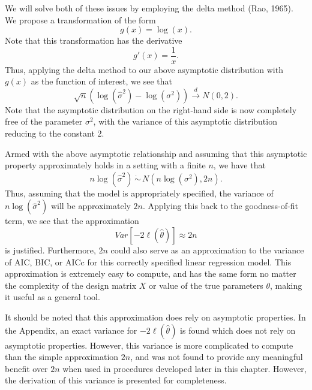 		We will solve both of these issues by employing the delta method (Rao, 1965). We propose a transformation of the form
		\begin{equation}
			g(x) = \log(x) .
		\end{equation}
		Note that this transformation has the derivative
		\begin{equation}
			g'(x) = \frac{1}{x} .
		\end{equation}
		Thus, applying the delta method to our above asymptotic distribution with $g(x)$ as the function of interest, we see that
		\begin{equation}
			\sqrt{n} ( \log (\hat{\sigma}^2) - \log(\sigma^2)) \xrightarrow[]{d} N(0, 2) .
		\end{equation}
		Note that the asymptotic distribution on the right-hand side is now completely free of the parameter $\sigma^2$, with the variance of this asymptotic distribution reducing
		to the constant 2.

		Armed with the above asymptotic relationship and assuming that this asymptotic property approximately holds in a setting with a finite $n$, we have that
		\begin{equation}
			n\log(\hat{\sigma}^2) \, \dot\sim \, N \left( n\log(\sigma^2), 2n \right) .
		\end{equation}
		Thus, assuming that the model is appropriately specified, the variance of $n\log(\hat{\sigma}^2)$ will be approximately $2n$. Applying this back to the goodness-of-fit term,
		we see that the approximation
		\begin{equation}
			Var \left[ -2 \ell (\hat{\theta}  ) \right] \approx 2n
		\end{equation}
		is justified. Furthermore, $2n$ could also serve as an approximation to the variance of AIC, BIC, or AICc for this correctly specified linear regression model. This approximation
		is extremely easy to compute, and has the same form no matter the complexity of the design matrix $X$ or value of the true parameters $\theta$, making it useful as a
		general tool.

		It should be noted that this approximation does rely on asymptotic properties. In the Appendix, an exact variance for $-2 \ell (\hat{\theta})$ is found which does
		not rely on asymptotic properties. However, this variance is more complicated to compute than the simple approximation $2n$, and was not found to provide any meaningful
		benefit over $2n$ when used in procedures developed later in this chapter. However, the derivation of this variance is presented for completeness.
		
